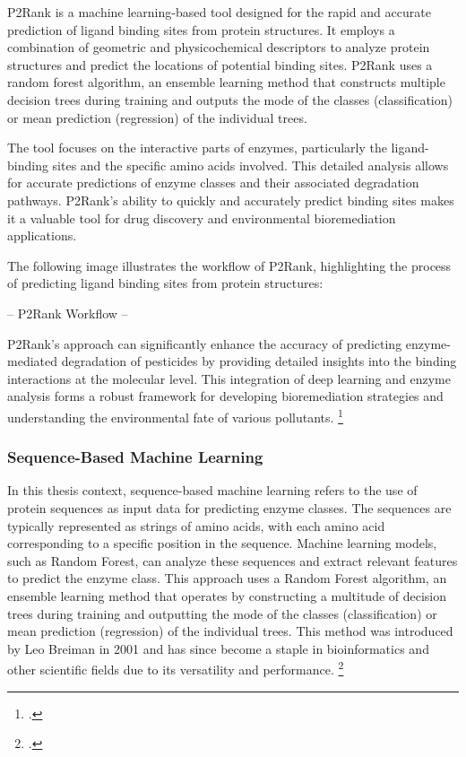 P2Rank is a machine learning-based tool designed for the rapid and accurate prediction of ligand binding sites from protein structures. It employs a combination of geometric and physicochemical descriptors to analyze protein structures and predict the locations of potential binding sites. P2Rank uses a random forest algorithm, an ensemble learning method that constructs multiple decision trees during training and outputs the mode of the classes (classification) or mean prediction (regression) of the individual trees.

The tool focuses on the interactive parts of enzymes, particularly the ligand-binding sites and the specific amino acids involved. This detailed analysis allows for accurate predictions of enzyme classes and their associated degradation pathways. P2Rank's ability to quickly and accurately predict binding sites makes it a valuable tool for drug discovery and environmental bioremediation applications.

The following image illustrates the workflow of P2Rank, highlighting the process of predicting ligand binding sites from protein structures:

-- P2Rank Workflow --

P2Rank's approach can significantly enhance the accuracy of predicting enzyme-mediated degradation of pesticides by providing detailed insights into the binding interactions at the molecular level. This integration of deep learning and enzyme analysis forms a robust framework for developing bioremediation strategies and understanding the environmental fate of various pollutants. \footcite{krivakP2RankMachineLearning2018}

\subsubsection{Sequence-Based Machine Learning}
\label{sec:Sequence-Based Machine Learning}

In this thesis context, sequence-based machine learning refers to the use of protein sequences as input data for predicting enzyme classes. The sequences are typically represented as strings of amino acids, with each amino acid corresponding to a specific position in the sequence. Machine learning models, such as Random Forest, can analyze these sequences and extract relevant features to predict the enzyme class. This approach uses a Random Forest algorithm, an ensemble learning method that operates by constructing a multitude of decision trees during training and outputting the mode of the classes (classification) or mean prediction (regression) of the individual trees. This method was introduced by Leo Breiman in 2001 and has since become a staple in bioinformatics and other scientific fields due to its versatility and performance. \footcite{breimanRandomForests2001}

